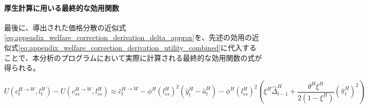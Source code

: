 \paragraph{厚生計算に用いる最終的な効用関数}\label{sec:appendix_welfare_correction_derivation_final_p1}

最後に、導出された価格分散の近似式\eqref{eq:appendix_welfare_correction_derivation_delta_approx}を、先述の効用の近似式\eqref{eq:appendix_welfare_correction_derivation_utility_combined}に代入することで、本分析のプログラムにおいて実際に計算される最終的な効用関数の式が得られる。

\begin{equation}
    U(c_t^{H\to W},l_t^H)-U(c_{ss}^{H\to W},l_{ss}^H)\approx\hat{c}_t^{H\to W}-\phi^H(l_{ss}^H)^2(\hat{y}_t^H-\hat{a}_t^H)-\phi^H(l_{ss}^H)^2\left(\xi^H\hat{\Delta}_{t-1}^H+\frac{\theta^H\xi^H}{2(1-\xi^H)}(\hat{\pi}_t^H)^2\right)
\label{eq:appendix_welfare_correction_derivation_final_utility}
\end{equation}